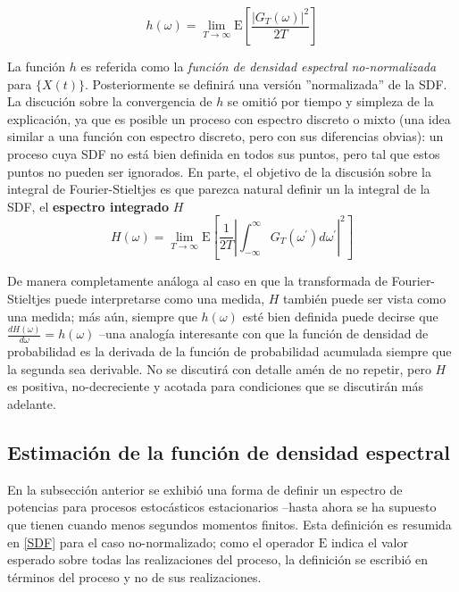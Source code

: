 \documentclass[12pt,a4paper]{mitthesis}
\newcommand{\intR}{\int_{-\infty}^{\infty}}
\newcommand{\prima}{^{\prime}}
\newcommand{\E}[1]{\mathrm{E}\left[ #1 \right]}
\begin{document}
\begin{equation}
h(\omega) = \lim_{T\rightarrow \infty} \E{ \frac{ \left| G_T(\omega) \right|^{2}}{2 T} }
\end{equation}

La funci\'on $h$ es referida como la \textit{funci\'on de densidad espectral no-normalizada} para
$\{X(t)\}$. Posteriormente se definir\'a una versi\'on ''normalizada'' de la SDF.
La discuci\'on sobre la convergencia de $h$ se omiti\'o por tiempo y simpleza de la explicaci\'on,
ya que es posible un proceso con espectro discreto o mixto (una idea similar a una funci\'on con 
espectro discreto, pero con sus diferencias obvias): un proceso cuya SDF no est\'a bien definida en 
todos sus puntos, pero tal que estos puntos no pueden ser ignorados.
En parte, el objetivo de la discusi\'on sobre la integral de Fourier-Stieltjes es que parezca 
natural definir un la integral de la SDF, el \textbf{espectro integrado} $H$
\begin{equation*}
H(\omega) = \lim_{T\rightarrow \infty} 
\E{ \frac{1}{2 T} \left| \intR G_T(\omega\prima) d\omega\prima \right|^{2} }
\end{equation*}

De manera completamente an\'aloga al caso en que la transformada de Fourier-Stieltjes puede
interpretarse como una medida, $H$ tambi\'en puede ser vista como una medida; m\'as a\'un, siempre 
que $h(\omega)$ est\'e bien definida puede decirse que $\frac{dH(\omega)}{d\omega}= h(\omega)$ 
--una analog\'ia interesante con que la funci\'on de densidad de probabilidad es la derivada de la 
funci\'on de probabilidad acumulada siempre que la segunda sea derivable.
No se discutir\'a con detalle am\'en de no repetir, pero $H$ es positiva, no-decreciente y acotada 
para condiciones que se discutir\'an m\'as adelante.


\subsection{Estimaci\'on de la funci\'on de densidad espectral}

En la subsecci\'on anterior se exhibi\'o una forma de definir un espectro de potencias para 
procesos estoc\'asticos estacionarios --hasta ahora se ha supuesto que tienen cuando menos segundos 
momentos finitos. Esta definici\'on es resumida en \ref{SDF} para el caso no-normalizado; como el 
operador $\mathrm{E}$ indica el valor esperado sobre todas las realizaciones del proceso, la 
definici\'on se escribi\'o en t\'erminos del proceso y no de sus realizaciones.
\end{document}
